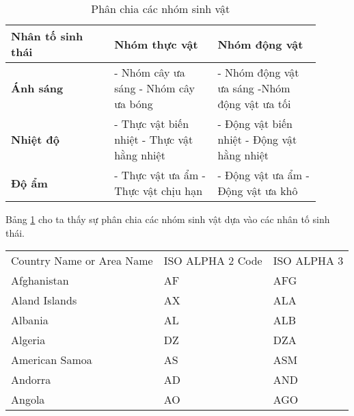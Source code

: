 \documentclass[12pt]{article}
\begin{document}
\begin{table}[h]
    \centering
    \begin{tabular}{||b{0.3\linewidth}|b{0.3\linewidth}|b{0.3\linewidth}||}
    \hline
    {\bf Nhân tố sinh thái} &  {\bf Nhóm thực vật} & {\bf Nhóm động vật}\\[0.2cm]
    \hline
    \hline\vspace{0.2cm}
    {\bf Ánh sáng} & - Nhóm cây ưa sáng \newline - Nhóm cây ưa bóng & - Nhóm động vật ưa sáng \newline -Nhóm động vật ưa tối\\[0.2cm]
    \hline
    {\bf Nhiệt độ} & - Thực vật biến nhiệt \newline - Thực vật hằng nhiệt & - Động vật biến nhiệt \newline - Động vật hằng nhiệt\\[0.2cm]
    \hline
    {\bf Độ ẩm} & - Thực vật ưa ẩm \newline - Thực vật chịu hạn & - Động vật ưa ẩm \newline - Động vật ưa khô\\[0.2cm]
    \hline
    \end{tabular}
    \caption{Phân chia các nhóm sinh vật}
    \label{t1}
\end{table}
Bảng \ref{t1} cho ta thấy sự phân chia các nhóm sinh vật dựa vào các nhân tố sinh thái.


{
\begin{tabular}{ |m{}|m{}|m{}|  }
\hline
\rowcolor{green!80!yellow!50}\multicolumn{3}{|c|}{Country List} \\
\hline
Country Name or Area Name& ISO ALPHA 2 Code &ISO ALPHA 3 \\
\hline
Afghanistan & AF &AFG \\
Aland Islands & AX   & ALA \\
Albania &AL & ALB \\
Algeria    &DZ & DZA \\
American Samoa & AS & ASM \\
Andorra & AD & AND   \\
Angola & AO & AGO \\
\hline
\end{tabular}}
\end{document}
